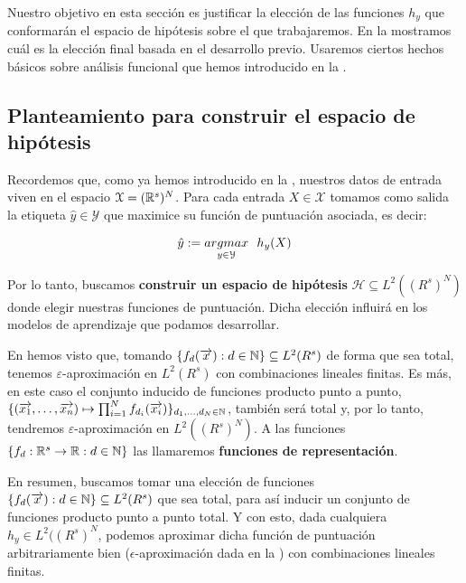 Nuestro objetivo en esta sección es justificar la elección de las funciones $h_y$ que conformarán el espacio de hipótesis sobre el que trabajaremos. En la  mostramos cuál es la elección final basada en el desarrollo previo. Usaremos ciertos hechos básicos sobre análisis funcional que hemos introducido en la .

\subsection{Planteamiento para construir el espacio de hipótesis} \label{sec:justificacion_func_repr}

Recordemos que, como ya hemos introducido en la , nuestros datos de entrada viven en el espacio $\mathcal{X} = (\mathbb{R}^s)^N$. Para cada entrada $X \in \mathcal{X}$ tomamos como salida la etiqueta $\hat{y} \in \mathcal{Y}$ que maximice su función de puntuación asociada, es decir:

\begin{equation}
	\hat{y} := \underset{y \in \mathcal{Y}}{argmax} \ \  h_y(X)
\end{equation}

Por lo tanto, buscamos \textbf{construir un espacio de hipótesis} $\mathcal{H} \subseteq L^2((R^s)^N)$ donde elegir nuestras funciones de puntuación. Dicha elección influirá en los modelos de aprendizaje que podamos desarrollar.

En  hemos visto que, tomando $\{f_d(\overrightarrow{x}): d \in \mathbb{N}\} \subseteq L^2(R^s)$ de forma que sea total, tenemos $\varepsilon$-aproximación en $L^2(R^s)$ con combinaciones lineales finitas. Es más, en este caso el conjunto inducido de funciones producto punto a punto, $\{(\overrightarrow{x_1}, \ldots, \overrightarrow{x_n}) \mapsto \prod_{i = 1}^N f_{d_i}(\overrightarrow{x_i}) \}_{d_1, \ldots, d_N \in \mathbb{N}}$, también será total y, por lo tanto, tendremos $\varepsilon$-aproximación en $L^2((R^s)^N)$. A las funciones $\{ f_d: \mathbb{R}^s \to \mathbb{R}: d \in \mathbb{N} \}$ las llamaremos \textbf{funciones de representación}.

En resumen, buscamos tomar una elección de funciones $\{f_d(\overrightarrow{x}): d \in \mathbb{N}\} \subseteq L^2(R^s)$ que sea total, para así inducir un conjunto de funciones producto punto a punto total. Y con esto, dada cualquiera $h_y \in L^2((R^s)^N$, podemos aproximar dicha función de puntuación arbitrariamente bien ($\epsilon$-aproximación dada en la ) con combinaciones lineales finitas.

